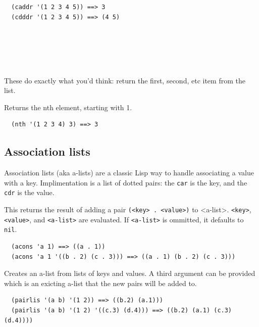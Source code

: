 \documentclass[12pt]{article}
\begin{document}
\begin{verbatim}
  (caddr '(1 2 3 4 5)) ==> 3
  (cdddr '(1 2 3 4 5)) ==> (4 5)
\end{verbatim}

\\
\\
\\
\\

These do exactly what you'd think: return the first, second, etc item
from the list.


Returns the nth element, starting with 1.

\begin{verbatim}
  (nth '(1 2 3 4) 3) ==> 3
\end{verbatim}

\subsection{Association lists}

Association lists (aka a-lists) are a classic Lisp way to handle associating a value
with a key. Implimentation is a list of dotted pairs: the \verb|car|
is the key, and the \verb|cdr| is the value.


This returns the result of adding a pair \verb|(<key> . <value>)| to
<a-list>. \verb|<key>|, \verb|<value>|, and \verb|<a-list>| are
evaluated. If \verb|<a-list>| is ommitted, it defaults to \verb|nil|.

\begin{verbatim}
  (acons 'a 1) ==> ((a . 1))
  (acons 'a 1 '((b . 2) (c . 3))) ==> ((a . 1) (b . 2) (c . 3)))
\end{verbatim}


Creates an a-list from lists of keys and values. A third argument can
be provided which is an exicting a-list that the new pairs will be
added to.

\begin{verbatim}
  (pairlis '(a b) '(1 2)) ==> ((b.2) (a.1)))
  (pairlis '(a b) '(1 2) '((c.3) (d.4))) ==> ((b.2) (a.1) (c.3) (d.4))))
\end{verbatim}
\end{document}
